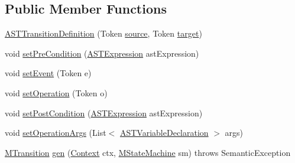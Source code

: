\subsection*{Public Member Functions}
\begin{DoxyCompactItemize}
\item 
\hyperlink{classorg_1_1tzi_1_1use_1_1parser_1_1use_1_1statemachines_1_1_a_s_t_transition_definition_aaa4eb738a384ac95cfc77a7da212cec3}{A\-S\-T\-Transition\-Definition} (Token \hyperlink{classorg_1_1tzi_1_1use_1_1parser_1_1use_1_1statemachines_1_1_a_s_t_transition_definition_a756d17c4270e686d8db9c16a71b7d37c}{source}, Token \hyperlink{classorg_1_1tzi_1_1use_1_1parser_1_1use_1_1statemachines_1_1_a_s_t_transition_definition_a24e0ee5ecc1045178eaea544c570ff7f}{target})
\item 
void \hyperlink{classorg_1_1tzi_1_1use_1_1parser_1_1use_1_1statemachines_1_1_a_s_t_transition_definition_aa31e1b47c07d0b474425a876e1fe5700}{set\-Pre\-Condition} (\hyperlink{classorg_1_1tzi_1_1use_1_1parser_1_1ocl_1_1_a_s_t_expression}{A\-S\-T\-Expression} ast\-Expression)
\item 
void \hyperlink{classorg_1_1tzi_1_1use_1_1parser_1_1use_1_1statemachines_1_1_a_s_t_transition_definition_a49d1c33eeee9c04dc8611e4bf583d3bd}{set\-Event} (Token e)
\item 
void \hyperlink{classorg_1_1tzi_1_1use_1_1parser_1_1use_1_1statemachines_1_1_a_s_t_transition_definition_a679e1dd376884a6da5345ab3466bc435}{set\-Operation} (Token o)
\item 
void \hyperlink{classorg_1_1tzi_1_1use_1_1parser_1_1use_1_1statemachines_1_1_a_s_t_transition_definition_a660b84667e94aa5a2c712f3cd2eebd7f}{set\-Post\-Condition} (\hyperlink{classorg_1_1tzi_1_1use_1_1parser_1_1ocl_1_1_a_s_t_expression}{A\-S\-T\-Expression} ast\-Expression)
\item 
void \hyperlink{classorg_1_1tzi_1_1use_1_1parser_1_1use_1_1statemachines_1_1_a_s_t_transition_definition_a3c6398d8f1c93ea68a1e616cf774ac01}{set\-Operation\-Args} (List$<$ \hyperlink{classorg_1_1tzi_1_1use_1_1parser_1_1ocl_1_1_a_s_t_variable_declaration}{A\-S\-T\-Variable\-Declaration} $>$ args)
\item 
\hyperlink{classorg_1_1tzi_1_1use_1_1uml_1_1mm_1_1statemachines_1_1_m_transition}{M\-Transition} \hyperlink{classorg_1_1tzi_1_1use_1_1parser_1_1use_1_1statemachines_1_1_a_s_t_transition_definition_a81428241abe4d362358034fc38afc354}{gen} (\hyperlink{classorg_1_1tzi_1_1use_1_1parser_1_1_context}{Context} ctx, \hyperlink{classorg_1_1tzi_1_1use_1_1uml_1_1mm_1_1statemachines_1_1_m_state_machine}{M\-State\-Machine} sm)  throws Semantic\-Exception 
\end{DoxyCompactItemize}
